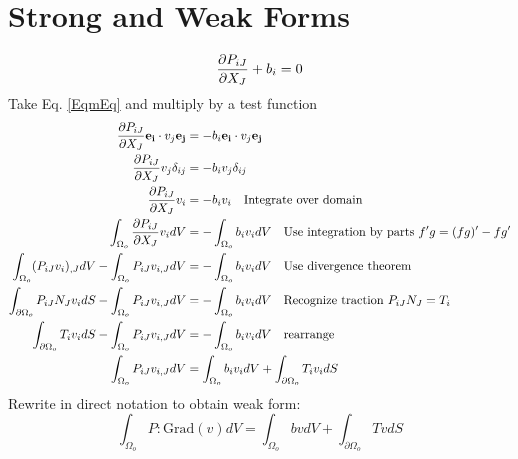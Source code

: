 \documentclass[12pt,3p]{article}
\begin{document}
\section{Strong and Weak Forms}
\begin{equation}\label{EqmEq}
\pdv{P_{iJ}}{X_J} + b_i = 0 
\end{equation}
Take Eq. \ref{EqmEq} and multiply by a test function 
\begin{align*}
\pdv{P_{iJ}}{X_J} \mathbf{e_i} \cdot v_j \mathbf{e_j} &= - b_i \mathbf{e_i} \cdot v_j \mathbf{e_j} \\
\pdv{P_{iJ}}{X_J} v_j \delta_{ij} &= - b_i v_j \delta_{ij} \\
\pdv{P_{iJ}}{X_J} v_i &= - b_i v_i \quad \text{Integrate over domain} \\
\int_{\Omega_o} \pdv{P_{iJ}}{X_J} v_i dV &= - \int_{\Omega_o} b_i v_i dV \quad \text{Use integration by parts } f'g = (fg)' - f g' \\
\int_{\Omega_o} (P_{iJ} v_i)_{,J} dV - \int_{\Omega_o} P_{iJ} v_{i,J} dV &= - \int_{\Omega_o} b_i v_i dV \quad \text{Use divergence theorem} \\
\int_{\partial \Omega_o} P_{iJ} N_J v_i dS - \int_{\Omega_o} P_{iJ} v_{i,J} dV &= - \int_{\Omega_o} b_i v_i dV \quad \text{Recognize traction } P_{iJ} N_J = T_i\\
\int_{\partial \Omega_o} T_i v_i dS - \int_{\Omega_o} P_{iJ} v_{i,J} dV &= - \int_{\Omega_o} b_i v_i dV \quad \text{rearrange} \\
\int_{\Omega_o} P_{iJ} v_{i,J} dV &= \int_{\Omega_o} b_i v_i dV + \int_{\partial \Omega_o} T_i v_i dS 
\end{align*}
Rewrite in direct notation to obtain weak form: 
\begin{equation}\label{wForm}
 \int_{\Omega_o} P : \text{Grad}(v) dV = \int_{\Omega_o} b v dV + \int_{\partial \Omega_o} T v dS
\end{equation}
\end{document}
